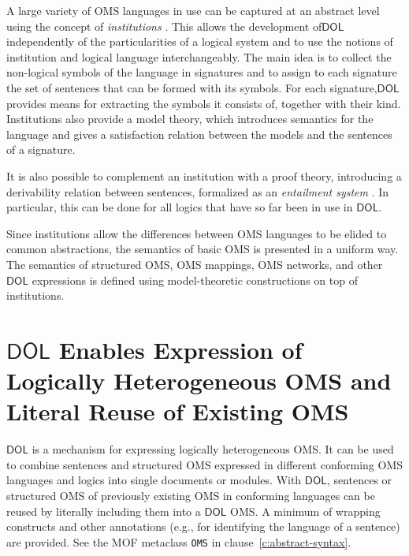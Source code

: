 \documentclass[10pt,fleqn,final]{scrreprt}
\newcommand{\cbs}[0]{\color{red}\xspace} %
\newcommand{\cbe}[0]{\color{black}\xspace} %
\newcommand*{\syntax}[1]{\texttt{#1}}
\newcommand*{\DOL}{\ensuremath{\mathsf{DOL}}\xspace}
\newenvironment{definitions}[0]{\medskip }{}
\begin{document}
\begin{definitions}
A large variety of OMS languages in use can be captured at an abstract level using the concept of 
\emph{institutions} \cite{GoguenBurstall92}.
This allows the development of\cbs \DOL\cbe independently of the particularities of a logical system and to use the notions of institution and  logical language interchangeably. 
The main idea is to collect the non-logical
symbols of the language in signatures and to assign to each signature the set of sentences that can be formed with its symbols. 
For each signature,\cbs \DOL provides means\cbe for extracting the symbols it consists of, together with their kind.
Institutions also provide a model theory, which introduces semantics for
the language and gives a satisfaction relation between the models and
the sentences of a signature.   

It is also possible to complement an institution with a proof theory,
introducing a derivability relation between sentences, formalized as 
an \emph{entailment system} \cite{Meseguer89}. In particular, this
can be done for all logics that have so far been in use in \DOL.


Since institutions allow the differences between OMS languages to be elided to common abstractions, 
the semantics of basic OMS is presented in a uniform way.  The semantics of structured OMS, 
OMS mappings, OMS networks, and other \DOL expressions is defined using model-theoretic constructions
on top of institutions. 


\section{\DOL Enables Expression of Logically Heterogeneous OMS and Literal Reuse of Existing OMS}
\DOL is a mechanism for expressing logically heterogeneous OMS. It can be used to combine sentences and structured OMS expressed in different conforming OMS languages
and logics into single documents or modules. With \DOL, sentences or structured OMS of previously existing OMS in
conforming languages can be reused by literally including them into a \DOL OMS. A minimum of wrapping constructs and other annotations (e.g., for identifying the language of a sentence) are provided. 
 See the
\cbs MOF metaclass \cbe  \syntax{OMS} in
clause~\ref{c:abstract-syntax}.


\end{definitions}
\end{document}
